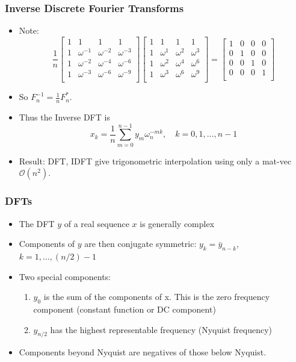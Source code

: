 \documentclass[10pt]{beamer}
\newcommand{\mO}{{\mathcal{O}}}
\begin{document}
\begin{frame}
  \frametitle{Inverse Discrete Fourier Transforms}
  \begin{itemize}
  \item Note:
  \[
\frac{1}{n}
\begin{bmatrix}
1 & 1 & 1 & 1\\
1 & \omega^{-1} & \omega^{-2} & \omega^{-3}\\
1 & \omega^{-2} & \omega^{-4} & \omega^{-6}\\
1 & \omega^{-3} & \omega^{-6} & \omega^{-9}\\
\end{bmatrix}
\begin{bmatrix}
1 & 1 & 1 & 1\\
1 & \omega^1 & \omega^2 & \omega^3\\
1 & \omega^2 & \omega^4 & \omega^6\\
1 & \omega^3 & \omega^6 & \omega^9\\
\end{bmatrix}
=
\begin{bmatrix}
1 & 0 & 0 & 0\\
0 & 1 & 0 & 0\\
0 & 0 & 1 & 0\\
0 & 0 & 0 & 1\\
\end{bmatrix}
\]
  \item So $F_n^{-1} = \frac{1}{n} F_n^{*}$.
  \item Thus the Inverse DFT is
\[
x_k = \frac{1}{n} \sum_{m=0}^{n-1} y_m \omega_n^{-mk}, \quad k=0,1,\dots,n-1
\]

  \item Result: DFT, IDFT give trigonometric interpolation using only a mat-vec
$\mO(n^2)$.
  \end{itemize}
\end{frame}
\begin{frame}
\frametitle{DFTs}
  \begin{itemize}
  \item The DFT $y$ of a real sequence $x$ is generally complex
  \item Components of $y$ are then conjugate symmetric: $y_k = \bar{y}_{n-k}$,
$k=1,\dots, (n/2)-1$
  \item Two special components:
  \begin{enumerate}
  \item $y_0$ is the sum of the components of x.  This is the zero frequency
component (constant function or DC component)
  \item $y_{n/2}$ has the highest representable frequency (Nyquist frequency)
  \end{enumerate}
  \item Components beyond Nyquist are negatives of those below Nyquist.
  \end{itemize}
\end{frame}
\end{document}
